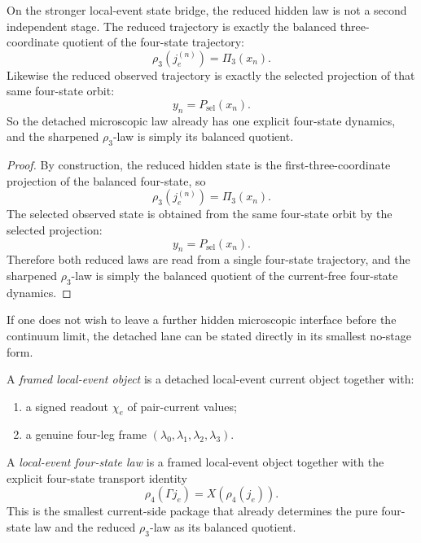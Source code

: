\begin{corollary}
\label{cor:the-reduced-rho3-law-is-the-balanced-quotient-of-the-four-state-law}
On the stronger local-event state bridge, the reduced hidden law is not a
second independent stage. The reduced trajectory is exactly the balanced
three-coordinate quotient of the four-state trajectory:
\[
\rho_3(j_e^{(n)})=\Pi_3(x_n).
\]
Likewise the reduced observed trajectory is exactly the selected projection of
that same four-state orbit:
\[
y_n=P_{\mathrm{sel}}(x_n).
\]
So the detached microscopic law already has one explicit four-state dynamics,
and the sharpened \(\rho_3\)-law is simply its balanced quotient.
\end{corollary}

\begin{proof}
By construction, the reduced hidden state is the first-three-coordinate
projection of the balanced four-state, so
\[
\rho_3(j_e^{(n)})=\Pi_3(x_n).
\]
The selected observed state is obtained from the same four-state orbit by the
selected projection:
\[
y_n=P_{\mathrm{sel}}(x_n).
\]
Therefore both reduced laws are read from a single four-state trajectory, and
the sharpened \(\rho_3\)-law is simply the balanced quotient of the current-free
four-state dynamics.
\end{proof}

\begin{definition}
\label{def:no-stage-local-event-four-state-law}
If one does not wish to leave a further hidden microscopic interface before the
continuum limit, the detached lane can be stated directly in its smallest
no-stage form.

A \emph{framed local-event object} is a detached local-event current object
together with:
\begin{enumerate}
\item a signed readout \(\chi_e\) of pair-current values;
\item a genuine four-leg frame
      \((\lambda_0,\lambda_1,\lambda_2,\lambda_3)\).
\end{enumerate}

A \emph{local-event four-state law} is a framed local-event object together
with the explicit four-state transport identity
\[
\rho_4(\Gamma j_e)=X(\rho_4(j_e)).
\]
This is the smallest current-side package that already determines the
pure four-state law and the reduced \(\rho_3\)-law as its balanced quotient.
\end{definition}

